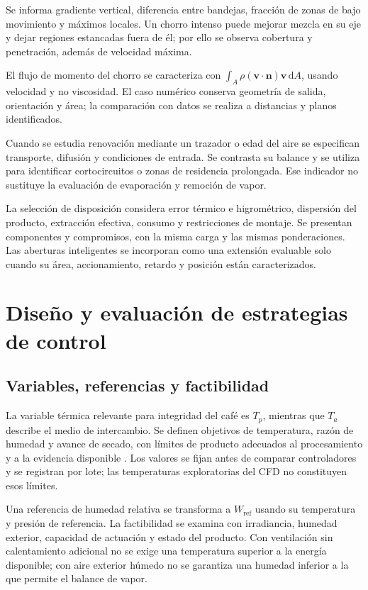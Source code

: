 Se informa gradiente vertical, diferencia entre bandejas, fracción de zonas de bajo movimiento y máximos locales. Un chorro intenso puede mejorar mezcla en su eje y dejar regiones estancadas fuera de él; por ello se observa cobertura y penetración, además de velocidad máxima.

El flujo de momento del chorro se caracteriza con $\int_A\rho(\mathbf v\cdot\mathbf n)\mathbf v\,\mathrm dA$, usando velocidad y no viscosidad. El caso numérico conserva geometría de salida, orientación y área; la comparación con datos se realiza a distancias y planos identificados.

Cuando se estudia renovación mediante un trazador o edad del aire se especifican transporte, difusión y condiciones de entrada. Se contrasta su balance y se utiliza para identificar cortocircuitos o zonas de residencia prolongada. Ese indicador no sustituye la evaluación de evaporación y remoción de vapor.

La selección de disposición considera error térmico e higrométrico, dispersión del producto, extracción efectiva, consumo y restricciones de montaje. Se presentan componentes y compromisos, con la misma carga y las mismas ponderaciones. Las aberturas inteligentes se incorporan como una extensión evaluable solo cuando su área, accionamiento, retardo y posición están caracterizados.

\section{Diseño y evaluación de estrategias de control}
\label{met:control}

\subsection{Variables, referencias y factibilidad}

La variable térmica relevante para integridad del café es $T_p$, mientras que $T_a$ describe el medio de intercambio. Se definen objetivos de temperatura, razón de humedad y avance de secado, con límites de producto adecuados al procesamiento y a la evidencia disponible \cite{alves2017}. Los valores se fijan antes de comparar controladores y se registran por lote; las temperaturas exploratorias del CFD no constituyen esos límites.

Una referencia de humedad relativa se transforma a $W_{\mathrm{ref}}$ usando su temperatura y presión de referencia. La factibilidad se examina con irradiancia, humedad exterior, capacidad de actuación y estado del producto. Con ventilación sin calentamiento adicional no se exige una temperatura superior a la energía disponible; con aire exterior húmedo no se garantiza una humedad inferior a la que permite el balance de vapor.

